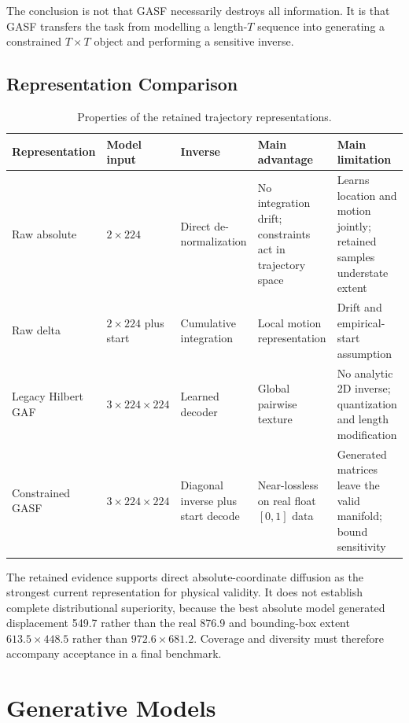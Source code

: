 \documentclass[12pt,a4paper,oneside]{report}
\begin{document}
The conclusion is not that GASF necessarily destroys all information. It is that GASF transfers the task from modelling a length-$T$ sequence into generating a constrained $T\times T$ object and performing a sensitive inverse.

\section{Representation Comparison}

\begin{table}[htbp]
\centering
\caption{Properties of the retained trajectory representations.}
\label{tab:representation-comparison}
\small
\begin{tabular}{L{0.19\textwidth}L{0.16\textwidth}L{0.18\textwidth}L{0.22\textwidth}L{0.22\textwidth}}
\toprule
Representation & Model input & Inverse & Main advantage & Main limitation \\
\midrule
Raw absolute & $2\times224$ & Direct de-normalization & No integration drift; constraints act in trajectory space & Learns location and motion jointly; retained samples understate extent \\
Raw delta & $2\times224$ plus start & Cumulative integration & Local motion representation & Drift and empirical-start assumption \\
Legacy Hilbert GAF & $3\times224\times224$ & Learned decoder & Global pairwise texture & No analytic 2D inverse; quantization and length modification \\
Constrained GASF & $3\times224\times224$ & Diagonal inverse plus start decode & Near-lossless on real float $[0,1]$ data & Generated matrices leave the valid manifold; bound sensitivity \\
\bottomrule
\end{tabular}
\end{table}

The retained evidence supports direct absolute-coordinate diffusion as the strongest current representation for physical validity. It does not establish complete distributional superiority, because the best absolute model generated displacement 549.7 rather than the real 876.9 and bounding-box extent $613.5\times448.5$ rather than $972.6\times681.2$. Coverage and diversity must therefore accompany acceptance in a final benchmark.

\chapter{Generative Models}
\label{chap:models}
\end{document}
